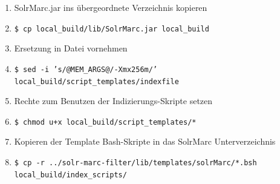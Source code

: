 \documentclass[10pt]{article}
\begin{document}
\begin{enumerate}
\begin{enumerate}
		\item SolrMarc.jar ins übergeordnete Verzeichnis kopieren
		\item[] \texttt{\$ cp local\_build/lib/SolrMarc.jar local\_build}
		
		\item Ersetzung in Datei vornehmen 
		\item[] \texttt{\$ sed -i 's/@MEM\_ARGS@/-Xmx256m/' local\_build/script\_templates/indexfile}
		
		\item Rechte zum Benutzen der Indizierungs-Skripte setzen
		\item[] \texttt{\$ chmod u+x local\_build/script\_templates/*}
		
		\item Kopieren der Template Bash-Skripte in das SolrMarc Unterverzeichnis
		\item[] \texttt{\$ cp -r ../solr-marc-filter/lib/templates/solrMarc/*.bsh local\_build/index\_scripts/}
		

\end{enumerate}
\end{enumerate}
\end{document}
